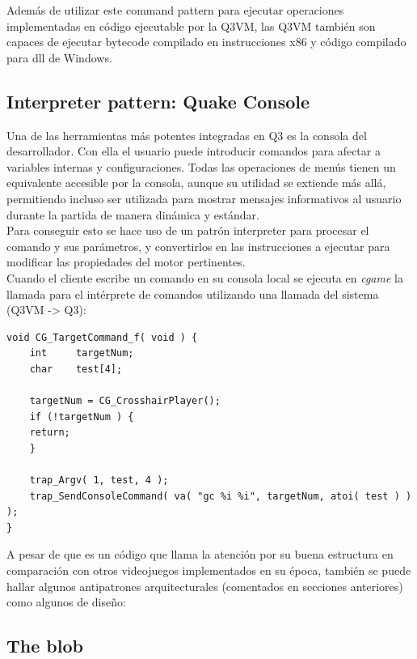 \documentclass[a4paper,12pt]{report}
\begin{document}
	
	Además de utilizar este command pattern para ejecutar operaciones implementadas en código ejecutable por la Q3VM, las Q3VM también son capaces de ejecutar bytecode compilado en instrucciones x86 y código compilado para dll de Windows. \cite{q3vmbb}
	
	
		\subsection{Interpreter pattern: Quake Console}
	Una de las herramientas más potentes integradas en Q3 es la consola del desarrollador. Con ella el usuario puede introducir comandos para afectar a variables internas y configuraciones. Todas las operaciones de menús tienen un equivalente accesible por la consola, aunque su utilidad se extiende más allá, permitiendo incluso ser utilizada para mostrar mensajes informativos al usuario durante la partida de manera dinámica y estándar.\\
	
	Para conseguir esto se hace uso de un patrón interpreter para procesar el comando y sus parámetros, y convertirlos en las instrucciones a ejecutar para modificar las propiedades del motor pertinentes.\cite{console_source}\cite{consolecmd_source}\\
	
	Cuando el cliente escribe un comando en su consola local se ejecuta en \textit{cgame} la llamada para el intérprete de comandos utilizando una llamada del sistema (Q3VM -> Q3):\\
	
	\begin{lstlisting}[style=C, numbers=none]
void CG_TargetCommand_f( void ) {
    int		targetNum;
    char	test[4];
    
    targetNum = CG_CrosshairPlayer();
    if (!targetNum ) {
    return;
    }
    
    trap_Argv( 1, test, 4 );
    trap_SendConsoleCommand( va( "gc %i %i", targetNum, atoi( test ) ) );
}
	\end{lstlisting}
	
A pesar de que es un código que llama la atención por su buena estructura en comparación con otros videojuegos implementados en su época, también se puede hallar algunos antipatrones arquitecturales (comentados en secciones anteriores) como algunos de diseño:\\

\subsection{The blob}
\end{document}
